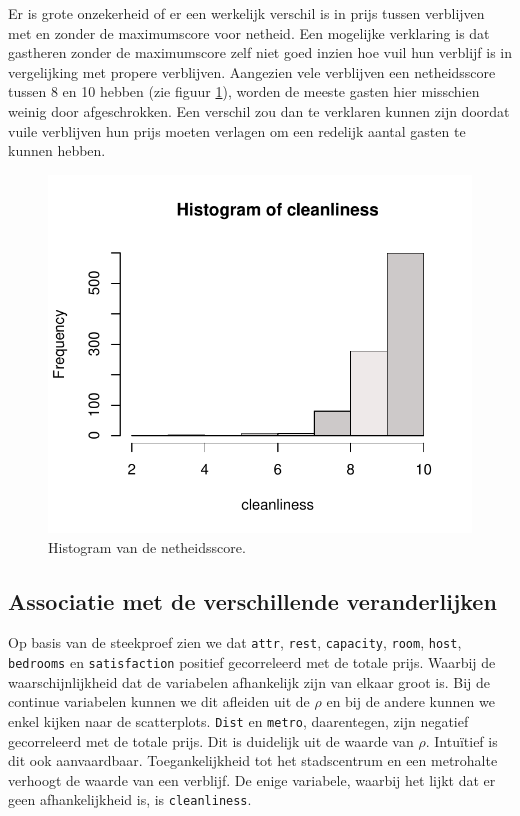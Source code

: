 \documentclass[a4paper]{kulakarticle}
\begin{document}
	Er is grote onzekerheid of er een werkelijk verschil is in prijs tussen verblijven met en zonder de maximumscore voor netheid. Een mogelijke verklaring is dat gastheren zonder de maximumscore zelf niet goed inzien hoe vuil hun verblijf is in vergelijking met propere verblijven. Aangezien vele verblijven een netheidsscore tussen 8 en 10 hebben (zie figuur \ref{fig:cleanliness}), worden de meeste gasten hier misschien weinig door afgeschrokken. Een verschil zou dan te verklaren kunnen zijn doordat vuile verblijven hun prijs moeten verlagen om een redelijk aantal gasten te kunnen hebben.
	
	\begin{figure}
		\centering
		\includegraphics{Figuren/cleanliness_hist.pdf}
		\caption{Histogram van de netheidsscore.}
		\label{fig:cleanliness}
	\end{figure}
	
	\subsection{Associatie met de verschillende veranderlijken}
	
	Op basis van de steekproef zien we dat \verb*|attr|,  \verb*|rest|,  \verb*|capacity|,  \verb*|room|,  \verb*|host|,  \verb*|bedrooms| en  \verb*|satisfaction| positief gecorreleerd met de totale prijs. Waarbij de waarschijnlijkheid dat de variabelen afhankelijk zijn van elkaar groot is. Bij de continue variabelen kunnen we dit afleiden uit de $\rho$ en bij de andere kunnen we enkel kijken naar de scatterplots. \verb*|Dist| en \verb*|metro|, daarentegen, zijn negatief gecorreleerd met de totale prijs. Dit is duidelijk uit de waarde van $\rho$. Intuïtief is dit ook aanvaardbaar. Toegankelijkheid tot het stadscentrum en een metrohalte verhoogt de waarde van een verblijf. De enige variabele, waarbij het lijkt dat er geen afhankelijkheid is, is  \verb*|cleanliness|.
\end{document}
